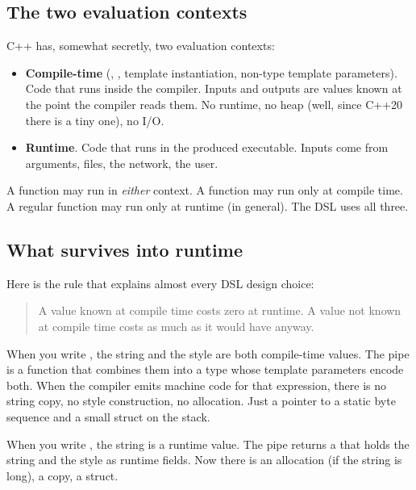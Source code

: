 \subsection*{The two evaluation contexts}

C++ has, somewhat secretly, two evaluation contexts:

\begin{itemize}[leftmargin=*]
  \item \textbf{Compile-time} (,
    , template instantiation, non-type template
    parameters). Code that runs inside the compiler. Inputs and
    outputs are values known at the point the compiler reads
    them. No runtime, no heap (well, since C++20 there is a tiny
    one), no I/O.
  \item \textbf{Runtime}. Code that runs in the produced
    executable. Inputs come from arguments, files, the network,
    the user.
\end{itemize}

A  function may run in \emph{either} context. A
 function may run only at compile time. A regular
function may run only at runtime (in general). The DSL uses all
three.

\subsection*{What survives into runtime}

Here is the rule that explains almost every DSL design choice:

\begin{quote}
A value known at compile time costs zero at runtime. A value not
known at compile time costs as much as it would have anyway.
\end{quote}

When you write , the string 
and the style  are both compile-time values. The pipe
is a  function that combines them into a
 type whose template parameters encode both. When
the compiler emits machine code for that expression, there is no
string copy, no style construction, no allocation. Just a pointer
to a static byte sequence and a small struct on the stack.

When you write , the string is a
runtime value. The pipe returns a  that
holds the string and the style as runtime fields. Now there is
an allocation (if the string is long), a copy, a struct.

